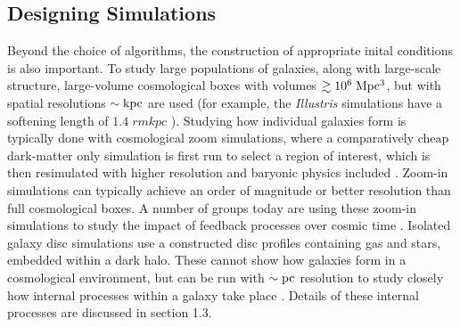 \subsection{Designing Simulations}
Beyond the choice of algorithms, the construction of appropriate inital
conditions is also important.  To study large populations of galaxies, along
with large-scale structure, large-volume cosmological boxes with volumes
$\gtrsim 10^6\;\rm{Mpc^3}$, but with spatial resolutions $\sim \rm{kpc}$ are
used (for example, the {\it Illustris} simulations have a softening length of
$1.4\;rm{kpc}$ \citealt{Vogelsberger2014}).  Studying how individual galaxies
form is typically done with cosmological zoom simulations, where a comparatively
cheap dark-matter only simulation is first run to select a region of interest,
which is then resimulated with higher resolution and baryonic physics included
\citep{Navarro1993}. Zoom-in simulations can typically achieve an order of
magnitude or better resolution than full cosmological boxes.  A number of groups
today are using these zoom-in simulations to study the impact of feedback
processes over cosmic time \citep{Stinson2013,Hopkins2014,Agertz2015}.  Isolated
galaxy disc simulations use a constructed disc profiles containing gas and
stars, embedded within a dark halo. These cannot show how galaxies form in a
cosmological environment, but can be run with $\sim \rm{pc}$ resolution to study
closely how internal processes within a galaxy take place
\citep{Hopkins2011,Benincasa2016}.  Details of these internal processes are
discussed in section 1.3.

